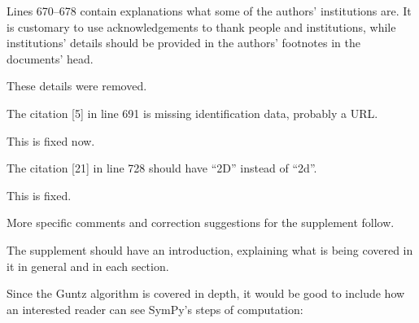\documentclass[answers,12pt]{exam}
\begin{document}
\begin{questions}
\begin{solution}
\end{solution}

\question Lines 670--678 contain explanations what some of the authors' institutions are. It is customary to use acknowledgements to thank people and institutions, while institutions' details should be provided in the authors' footnotes in the documents' head.
\begin{solution}
These details were removed.
\end{solution}

\question The citation [5] in line 691 is missing identification data, probably a URL\@.
\begin{solution}
This is fixed now.
\end{solution}

\question The citation [21] in line 728 should have ``2D'' instead of ``2d''.
\begin{solution}
This is fixed.
\end{solution}

More specific comments and correction suggestions for the supplement follow.

\question The supplement should have an introduction, explaining what is being covered in it in general and in each section.
\begin{solution}

\end{solution}

\question Since the Guntz algorithm is covered in depth, it would be good to
include how an interested reader can see SymPy's steps of computation:


\end{questions}
\end{document}
